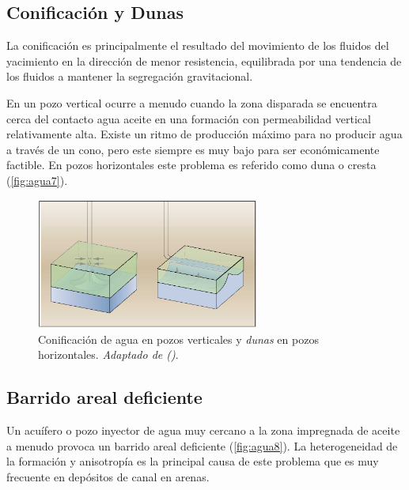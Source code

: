 \subsection{Conificación y Dunas}
La conificación es principalmente el resultado del movimiento de los fluidos del yacimiento en la dirección de menor resistencia, equilibrada por una tendencia de los fluidos a mantener la segregación gravitacional. 

En un pozo vertical ocurre a menudo cuando la zona disparada se encuentra cerca del contacto agua aceite en una formación con permeabilidad vertical relativamente alta. Existe un ritmo de producción máximo para no producir agua a través de un cono, pero este siempre es muy bajo para ser económicamente factible. En pozos horizontales este problema es referido como duna o cresta (\autoref{fig:agua7}).

\begin{figure}\centering
    \includegraphics[width=0.65\textwidth]{Graphics/agua7.png}
    \caption[Conificación y dunas]{Conificación de agua en pozos verticales y \emph{dunas} en pozos horizontales. \emph{Adaptado de (\cite{Bailey2000})}.}
    \label{fig:agua7}
\end{figure}

\subsection{Barrido areal deficiente}
Un acuífero o pozo inyector de agua muy cercano a la zona impregnada de aceite a menudo provoca un barrido areal deficiente (\autoref{fig:agua8}). La heterogeneidad de la formación y anisotropía es la principal causa de este problema que es muy frecuente en depósitos de canal en arenas.

